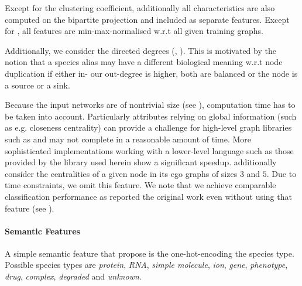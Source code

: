 \documentclass[
	fontsize=10pt, %
	twoside=false, %
	secnumdepth=1, %
  toc=indentunnumbered %
]{kaobook}
\begin{document}
Except for the clustering coefficient, additionally all characteristics are also
computed on the bipartite projection and included as separate features.
Except for , all features are min-max-normalised
w.r.t all given training graphs.


Additionally, we consider the directed degrees (,
). This is motivated by the notion that a species alias may
have a different biological meaning w.r.t node duplication if either in- our
out-degree is higher, both are balanced or the node is a source or a sink.

Because the input networks are of nontrivial size (see ),
computation time has to be taken into account.
% 
Particularly attributes relying on global information (such as e.g. closeness
centrality) can provide a challenge for high-level graph libraries such as
 and may not complete in a reasonable amount of time. More
sophisticated implementations working with a lower-level language such as those
provided by the  library used herein show a significant speedup.
\citeauthor{nielsen_MachineLearningSupport_2019} additionally consider the
centralities of a given node in its ego graphs of sizes $3$ and $5$. Due to time
constraints, we omit this feature. We note that we achieve comparable
classification performance as reported the original work even without using that
feature (see ).



\paragraph{Semantic Features}

A simple semantic feature that \citeauthor{nielsen_MachineLearningSupport_2019}
propose is the one-hot-encoding the species type.
Possible species types are
\textit{protein}, \textit{RNA}, \textit{simple molecule}, \textit{ion},
\textit{gene}, \textit{phenotype}, \textit{drug}, \textit{complex},
\textit{degraded} and \textit{unknown}. 
\end{document}
